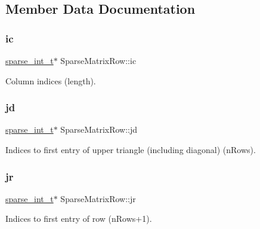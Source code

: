 \subsection{Member Data Documentation}
\mbox{\label{class_sparse_matrix_row_a46dd9b0b5138ecd2deb37415d170c6b5}} 
\subsubsection{\texorpdfstring{ic}{ic}}
{\footnotesize\ttfamily \hyperlink{_types_8hpp_aa5432b00c9081e2d62d7f38c32e4ed80}{sparse\+\_\+int\+\_\+t}$\ast$ Sparse\+Matrix\+Row\+::ic\hspace{0.3cm}{\ttfamily [protected]}}

Column indices (length). \mbox{\label{class_sparse_matrix_row_a8d71f4ae6afa7bd4ac153f9b11019a7a}} 
\subsubsection{\texorpdfstring{jd}{jd}}
{\footnotesize\ttfamily \hyperlink{_types_8hpp_aa5432b00c9081e2d62d7f38c32e4ed80}{sparse\+\_\+int\+\_\+t}$\ast$ Sparse\+Matrix\+Row\+::jd\hspace{0.3cm}{\ttfamily [protected]}}

Indices to first entry of upper triangle (including diagonal) (n\+Rows). \mbox{\label{class_sparse_matrix_row_a899e34180345977c83769223b3152bcc}} 
\subsubsection{\texorpdfstring{jr}{jr}}
{\footnotesize\ttfamily \hyperlink{_types_8hpp_aa5432b00c9081e2d62d7f38c32e4ed80}{sparse\+\_\+int\+\_\+t}$\ast$ Sparse\+Matrix\+Row\+::jr\hspace{0.3cm}{\ttfamily [protected]}}

Indices to first entry of row (n\+Rows+1). \mbox{\label{class_sparse_matrix_row_a7918a50ad51b4d9adadcbfcd64ea5a91}} 
